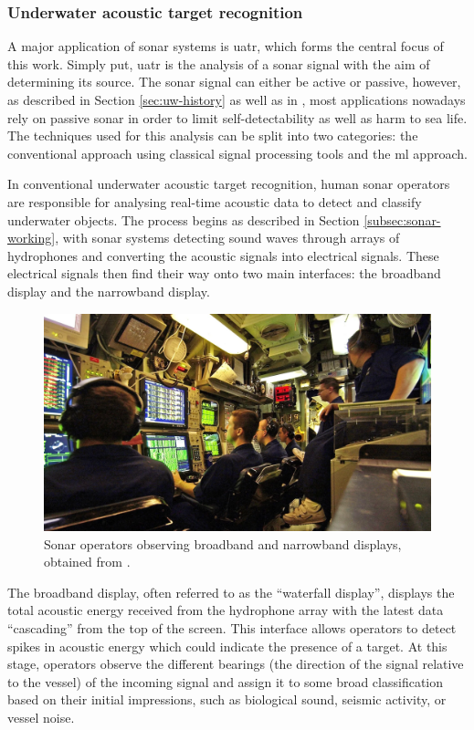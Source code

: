 \subsubsection{Underwater acoustic target recognition}\label{subsubsec:uatr-intro}

A major application of sonar systems is \acrfull{uatr}, which forms the central focus of this work. Simply put, \acrshort{uatr} is the analysis of a sonar signal with the aim of determining its source. The sonar signal can either be active or passive, however, as described in Section \ref{sec:uw-history} as well as in \cite{mishachandar_diverse_2021}, most applications nowadays rely on passive sonar in order to limit self-detectability as well as harm to sea life. The techniques used for this analysis can be split into two categories: the conventional approach using classical signal processing tools and the \acrfull{ml} approach.

In conventional underwater acoustic target recognition, human sonar operators are responsible for analysing real-time acoustic data to detect and classify underwater objects. The process begins as described in Section \ref{subsec:sonar-working}, with sonar systems detecting sound waves through arrays of hydrophones and converting the acoustic signals into electrical signals. These electrical signals then find their way onto two main interfaces: the broadband display and the narrowband display.

\begin{figure}[htbp]
    \centering
    \includegraphics[width=\textwidth]{img/ch2/sonar_operator.png}
    \caption{Sonar operators observing broadband and narrowband displays, obtained from \cite{amick_how_2020}.}
    \label{fig:enter-label}
\end{figure}

The broadband display, often referred to as the ``waterfall display'', displays the total acoustic energy received from the hydrophone array with the latest data ``cascading'' from the top of the screen. This interface allows operators to detect spikes in acoustic energy which could indicate the presence of a target. At this stage, operators observe the different bearings (the direction of the signal relative to the vessel) of the incoming signal and assign it to some broad classification based on their initial impressions, such as biological sound, seismic activity, or vessel noise.

